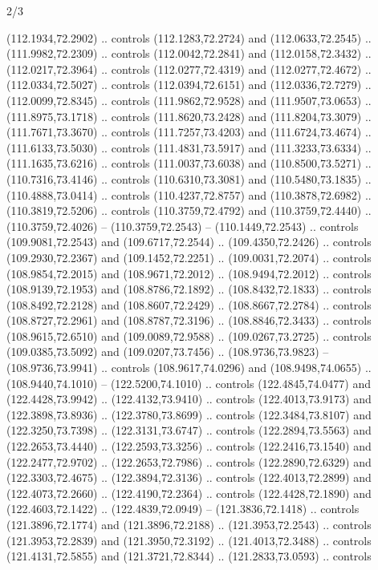 \begin{flagdescription}{2/3}
\begin{scope}[shift={(0.5\flaglength,0.5)},scale=\flagwidth/320]
\begin{scope}[y=0.8pt, x=0.8pt, yscale=-1,shift={(-118.3,-146)}]
  (112.1934,72.2902) .. controls (112.1283,72.2724) and (112.0633,72.2545) ..
  (111.9982,72.2309) .. controls (112.0042,72.2841) and (112.0158,72.3432) ..
  (112.0217,72.3964) .. controls (112.0277,72.4319) and (112.0277,72.4672) ..
  (112.0334,72.5027) .. controls (112.0394,72.6151) and (112.0336,72.7279) ..
  (112.0099,72.8345) .. controls (111.9862,72.9528) and (111.9507,73.0653) ..
  (111.8975,73.1718) .. controls (111.8620,73.2428) and (111.8204,73.3079) ..
  (111.7671,73.3670) .. controls (111.7257,73.4203) and (111.6724,73.4674) ..
  (111.6133,73.5030) .. controls (111.4831,73.5917) and (111.3233,73.6334) ..
  (111.1635,73.6216) .. controls (111.0037,73.6038) and (110.8500,73.5271) ..
  (110.7316,73.4146) .. controls (110.6310,73.3081) and (110.5480,73.1835) ..
  (110.4888,73.0414) .. controls (110.4237,72.8757) and (110.3878,72.6982) ..
  (110.3819,72.5206) .. controls (110.3759,72.4792) and (110.3759,72.4440) ..
  (110.3759,72.4026) -- (110.3759,72.2543) -- (110.1449,72.2543) .. controls
  (109.9081,72.2543) and (109.6717,72.2544) .. (109.4350,72.2426) .. controls
  (109.2930,72.2367) and (109.1452,72.2251) .. (109.0031,72.2074) .. controls
  (108.9854,72.2015) and (108.9671,72.2012) .. (108.9494,72.2012) .. controls
  (108.9139,72.1953) and (108.8786,72.1892) .. (108.8432,72.1833) .. controls
  (108.8492,72.2128) and (108.8607,72.2429) .. (108.8667,72.2784) .. controls
  (108.8727,72.2961) and (108.8787,72.3196) .. (108.8846,72.3433) .. controls
  (108.9615,72.6510) and (109.0089,72.9588) .. (109.0267,73.2725) .. controls
  (109.0385,73.5092) and (109.0207,73.7456) .. (108.9736,73.9823) --
  (108.9736,73.9941) .. controls (108.9617,74.0296) and (108.9498,74.0655) ..
  (108.9440,74.1010) -- (122.5200,74.1010) .. controls (122.4845,74.0477) and
  (122.4428,73.9942) .. (122.4132,73.9410) .. controls (122.4013,73.9173) and
  (122.3898,73.8936) .. (122.3780,73.8699) .. controls (122.3484,73.8107) and
  (122.3250,73.7398) .. (122.3131,73.6747) .. controls (122.2894,73.5563) and
  (122.2653,73.4440) .. (122.2593,73.3256) .. controls (122.2416,73.1540) and
  (122.2477,72.9702) .. (122.2653,72.7986) .. controls (122.2890,72.6329) and
  (122.3303,72.4675) .. (122.3894,72.3136) .. controls (122.4013,72.2899) and
  (122.4073,72.2660) .. (122.4190,72.2364) .. controls (122.4428,72.1890) and
  (122.4603,72.1422) .. (122.4839,72.0949) -- (121.3836,72.1418) .. controls
  (121.3896,72.1774) and (121.3896,72.2188) .. (121.3953,72.2543) .. controls
  (121.3953,72.2839) and (121.3950,72.3192) .. (121.4013,72.3488) .. controls
  (121.4131,72.5855) and (121.3721,72.8344) .. (121.2833,73.0593) .. controls

\end{scope}
\end{scope}
\end{flagdescription}
